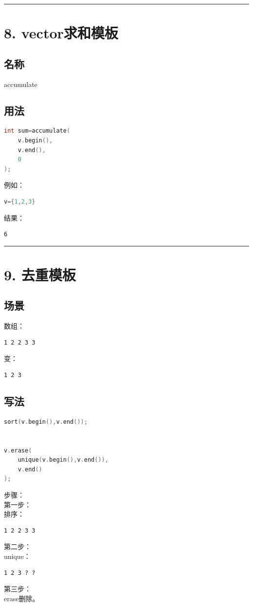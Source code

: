 \documentclass[9pt,twocolumn]{extarticle}
\begin{document}
\noindent\rule{\linewidth}{0.4pt}

\section{8. vector求和模板}

\subsection{名称}
accumulate

\subsection{用法}
\begin{lstlisting}[language=C++]
int sum=accumulate(
    v.begin(),
    v.end(),
    0
);
\end{lstlisting}
例如：
\begin{lstlisting}[language=C++]
v={1,2,3}
\end{lstlisting}
结果：
\begin{lstlisting}
6
\end{lstlisting}

\noindent\rule{\linewidth}{0.4pt}

\section{9. 去重模板}

\subsection{场景}
数组：
\begin{lstlisting}
1 2 2 3 3
\end{lstlisting}
变：
\begin{lstlisting}
1 2 3
\end{lstlisting}

\subsection{写法}
\begin{lstlisting}[language=C++]
sort(v.begin(),v.end());


v.erase(
    unique(v.begin(),v.end()),
    v.end()
);
\end{lstlisting}
步骤：\\
第一步：\\
排序：
\begin{lstlisting}
1 2 2 3 3
\end{lstlisting}
第二步：\\
unique：
\begin{lstlisting}
1 2 3 ? ?
\end{lstlisting}
第三步：\\
erase删除。
\end{document}
